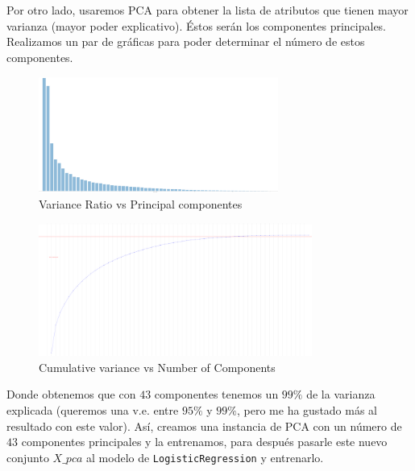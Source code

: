 \documentclass[letterpaper,11pt]{article}
\begin{document}
\begin{enumerate}
    Por otro lado, usaremos PCA para obtener la lista de atributos que tienen 
    mayor varianza (mayor poder explicativo). Éstos serán los componentes 
    principales. Realizamos un par de gráficas para poder determinar el 
    número de estos componentes.
    \begin{figure}[ht]
        \centering
        \includegraphics[width=0.7\textwidth]{imagenes/sonar-pca1.png}
        \caption{Variance Ratio vs Principal componentes }
    \end{figure}
    \begin{figure}[ht]
        \centering
        \includegraphics[width=0.8\textwidth]{imagenes/sonar-pca2.png}
        \caption{Cumulative variance vs Number of Components}
    \end{figure}

    Donde obtenemos que con $43$ componentes tenemos un $99\%$ de la 
    varianza explicada (queremos una v.e. entre $95\%$ y $99\%$, pero me ha 
    gustado más al resultado con este valor). Así, creamos una instancia 
    de PCA con un número de $43$ componentes principales y la entrenamos, 
    para después pasarle este nuevo conjunto $X\_pca$ al modelo de 
    \texttt{LogisticRegression} y entrenarlo.


\end{enumerate}
\end{document}
